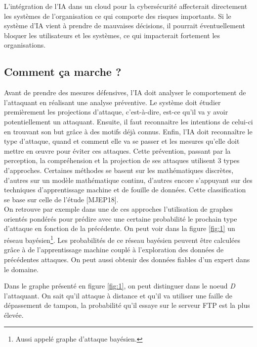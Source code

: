 \documentclass[a4paper, 12pt]{article}
\begin{document}
\begin{spacing}{1.1}
      L’intégration de l’IA dans un cloud pour la cybersécurité affecterait
      directement les systèmes de l’organisation ce qui comporte des risques
      importants. Si le système d'IA vient à prendre de mauvaises décisions, il
      pourrait éventuellement bloquer les utilisateurs et les systèmes, ce qui
      impacterait fortement les organisations.

    \subsection{Comment ça marche ?}
      Avant de prendre des mesures défensives, l’IA doit analyser le
      comportement de l’attaquant en réalisant une analyse préventive. Le
      système doit étudier premièrement les projections d’attaque, c’est-à-dire,
      est-ce qu’il va y avoir potentiellement un attaquant. Ensuite, il faut
      reconnaitre les intentions de celui-ci en trouvant son but grâce à des
      motifs déjà connus. Enfin, l’IA doit reconnaître le type d’attaque, quand
      et comment elle va se passer et les mesures qu’elle doit mettre en œuvre
      pour éviter ces attaques. Cette prévention, passant par la perception, la
      compréhension et la projection de ses attaques utilisent 3 types
      d’approches. Certaines méthodes se basent sur les mathématiques discrètes,
      d'autres sur un modèle mathématique continu, d'autres encore s'appuyant
      sur des techniques d'apprentissage machine et de fouille de données. Cette
      classification se base sur celle de l'étude [MJEP18]. \\


      On retrouve par exemple dans une de ces approches l’utilisation de graphes
      orientés pondérés pour prédire avec une certaine probabilité le prochain
      type d’attaque en fonction de la précédente. On peut voir dans la figure
      \ref{fig:1} un réseau bayésien\footnote{Aussi appelé graphe d'attaque
      bayésien.}. Les probabilités de ce réseau bayésien peuvent être calculées
      grâce à de l'apprentissage machine couplé à l'exploration des données de
      précédentes attaques. On peut aussi obtenir des données fiables d'un
      expert dans le domaine.

      Dans le graphe présenté en figure \ref{fig:1}, on peut distinguer dans le
      noeud \textit{D} l'attaquant. On sait qu'il attaque à distance et qu'il va
      utiliser une faille de dépassement de tampon, la probabilité qu'il essaye
      sur le serveur FTP est la plus élevée.


\end{spacing}
\end{document}
